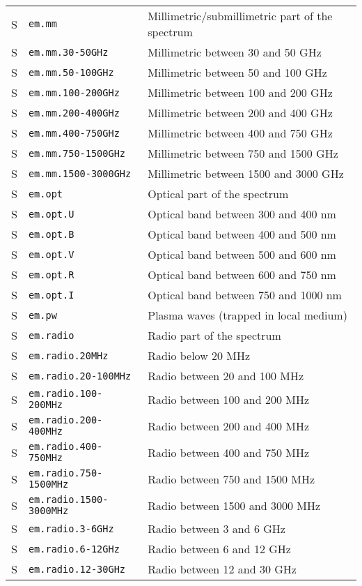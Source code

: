\documentclass[11pt,a4paper]{ivoa}
\begin{document}
\begin{longtable}[h!]{c|p{40ex}|p{}}
S & {\tt em.mm} & Millimetric/submillimetric part of the spectrum\\
S & {\tt em.mm.30-50GHz} & Millimetric between 30 and 50 GHz\\
S & {\tt em.mm.50-100GHz} & Millimetric between 50 and 100 GHz\\
S & {\tt em.mm.100-200GHz} & Millimetric between 100 and 200 GHz\\
S & {\tt em.mm.200-400GHz} & Millimetric between 200 and 400 GHz\\
S & {\tt em.mm.400-750GHz} & Millimetric between 400 and 750 GHz\\
S & {\tt em.mm.750-1500GHz} & Millimetric between 750 and 1500 GHz\\
S & {\tt em.mm.1500-3000GHz} & Millimetric between 1500 and 3000 GHz\\
S & {\tt em.opt} & Optical part of the spectrum\\
S & {\tt em.opt.U} & Optical band between 300 and 400 nm\\
S & {\tt em.opt.B} & Optical band between 400 and 500 nm\\
S & {\tt em.opt.V} & Optical band between 500 and 600 nm\\
S & {\tt em.opt.R} & Optical band between 600 and 750 nm\\
S & {\tt em.opt.I} & Optical band between 750 and 1000 nm\\
S & {\tt em.pw} & Plasma waves (trapped in local medium)\\
S & {\tt em.radio} & Radio part of the spectrum\\
S & {\tt em.radio.20MHz} & Radio below 20 MHz\\
S & {\tt em.radio.20-100MHz} & Radio between 20 and 100 MHz\\
S & {\tt em.radio.100-200MHz} & Radio between 100 and 200 MHz\\
S & {\tt em.radio.200-400MHz} & Radio between 200 and 400 MHz\\
S & {\tt em.radio.400-750MHz} & Radio between 400 and 750 MHz\\
S & {\tt em.radio.750-1500MHz} & Radio between 750 and 1500 MHz\\
S & {\tt em.radio.1500-3000MHz} & Radio between 1500 and 3000 MHz\\
S & {\tt em.radio.3-6GHz} & Radio between 3 and 6 GHz\\
S & {\tt em.radio.6-12GHz} & Radio between 6 and 12 GHz\\
S & {\tt em.radio.12-30GHz} & Radio between 12 and 30 GHz\\

\end{longtable}
\end{document}
